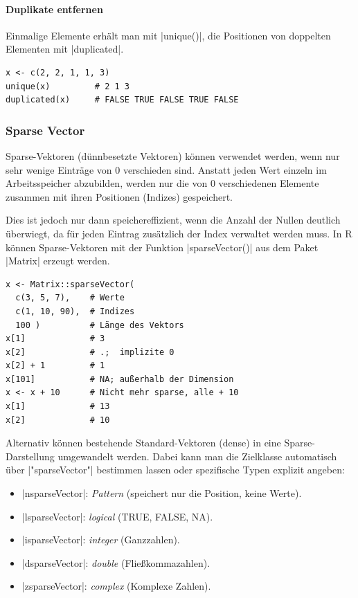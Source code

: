 \documentclass[10pt,twocolumn]{scrartcl}
\renewcommand{\lstinline}{\mycoloredinline}
\begin{document}
\paragraph{Duplikate entfernen}

Einmalige Elemente erhält man mit \lstinline|unique()|, die Positionen von doppelten Elementen mit \lstinline|duplicated|.

\begin{lstlisting}
x <- c(2, 2, 1, 1, 3)
unique(x)         # 2 1 3
duplicated(x)     # FALSE TRUE FALSE TRUE FALSE
\end{lstlisting}

\subsubsection{Sparse Vector}

Sparse-Vektoren (dünnbesetzte Vektoren) können verwendet werden, wenn nur sehr wenige Einträge von 0 verschieden sind. Anstatt jeden Wert einzeln im Arbeitsspeicher abzubilden, werden nur die von 0 verschiedenen Elemente zusammen mit ihren Positionen (Indizes) gespeichert.

Dies ist jedoch nur dann speichereffizient, wenn die Anzahl der Nullen deutlich überwiegt, da für jeden Eintrag zusätzlich der Index verwaltet werden muss. In R können Sparse-Vektoren mit der Funktion \lstinline|sparseVector()| aus dem Paket \lstinline|Matrix| erzeugt werden.

\begin{lstlisting}
x <- Matrix::sparseVector(
  c(3, 5, 7),    # Werte
  c(1, 10, 90),  # Indizes
  100 )          # Länge des Vektors
x[1]             # 3
x[2]             # .;  implizite 0
x[2] + 1         # 1
x[101]           # NA; außerhalb der Dimension
x <- x + 10      # Nicht mehr sparse, alle + 10
x[1]             # 13
x[2]             # 10
\end{lstlisting}

Alternativ können bestehende Standard-Vektoren (dense) in eine Sparse-Darstellung umgewandelt werden. Dabei kann man die Zielklasse automatisch über \lstinline|"sparseVector"| bestimmen lassen oder spezifische Typen explizit angeben:
\begin{itemize}
\item \lstinline|nsparseVector|: \emph{Pattern} (speichert nur die Position, keine Werte).
\item \lstinline|lsparseVector|: \emph{logical} (TRUE, FALSE, NA).
\item \lstinline|isparseVector|: \emph{integer} (Ganzzahlen).
\item \lstinline|dsparseVector|: \emph{double} (Fließkommazahlen).
\item \lstinline|zsparseVector|: \emph{complex} (Komplexe Zahlen).
\end{itemize}
\end{document}
